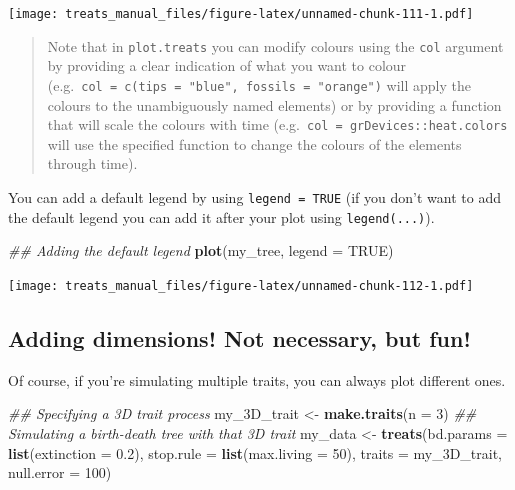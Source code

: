 \documentclass[
]{book}
\newenvironment{Shaded}{\begin{snugshade}}{\end{snugshade}}
\newcommand{\CommentTok}[1]{\textcolor[rgb]{0.56,0.35,0.01}{\textit{#1}}}
\newcommand{\DataTypeTok}[1]{\textcolor[rgb]{0.13,0.29,0.53}{#1}}
\newcommand{\DecValTok}[1]{\textcolor[rgb]{0.00,0.00,0.81}{#1}}
\newcommand{\FloatTok}[1]{\textcolor[rgb]{0.00,0.00,0.81}{#1}}
\newcommand{\KeywordTok}[1]{\textcolor[rgb]{0.13,0.29,0.53}{\textbf{#1}}}
\newcommand{\NormalTok}[1]{#1}
\newcommand{\OtherTok}[1]{\textcolor[rgb]{0.56,0.35,0.01}{#1}}
\newcommand{\StringTok}[1]{\textcolor[rgb]{0.31,0.60,0.02}{#1}}
\begin{document}
\texttt{[image: treats\_manual\_files/figure-latex/unnamed-chunk-111-1.pdf]}

\begin{quote}
Note that in \texttt{plot.treats} you can modify colours using the \texttt{col} argument by providing a clear indication of what you want to colour (e.g.~\texttt{col\ =\ c(tips\ =\ "blue",\ fossils\ =\ "orange")} will apply the colours to the unambiguously named elements) or by providing a function that will scale the colours with time (e.g.~\texttt{col\ =\ grDevices::heat.colors} will use the specified function to change the colours of the elements through time).
\end{quote}

You can add a default legend by using \texttt{legend\ =\ TRUE} (if you don't want to add the default legend you can add it after your plot using \texttt{legend(...)}).

\begin{Shaded}
\begin{Highlighting}[]
\CommentTok{\#\# Adding the default legend}
\KeywordTok{plot}\NormalTok{(my\_tree, }\DataTypeTok{legend =} \OtherTok{TRUE}\NormalTok{)}
\end{Highlighting}
\end{Shaded}

\texttt{[image: treats\_manual\_files/figure-latex/unnamed-chunk-112-1.pdf]}

\hypertarget{adding-dimensions-not-necessary-but-fun}{%
\subsection{Adding dimensions! Not necessary, but fun!}\label{adding-dimensions-not-necessary-but-fun}}

Of course, if you're simulating multiple traits, you can always plot different ones.

\begin{Shaded}
\begin{Highlighting}[]
\CommentTok{\#\# Specifying a 3D trait process}
\NormalTok{my\_3D\_trait \textless{}{-}}\StringTok{ }\KeywordTok{make.traits}\NormalTok{(}\DataTypeTok{n =} \DecValTok{3}\NormalTok{)}
\CommentTok{\#\# Simulating a birth{-}death tree with that 3D trait}
\NormalTok{my\_data \textless{}{-}}\StringTok{ }\KeywordTok{treats}\NormalTok{(}\DataTypeTok{bd.params  =} \KeywordTok{list}\NormalTok{(}\DataTypeTok{extinction =} \FloatTok{0.2}\NormalTok{),}
                  \DataTypeTok{stop.rule  =} \KeywordTok{list}\NormalTok{(}\DataTypeTok{max.living =} \DecValTok{50}\NormalTok{),}
                  \DataTypeTok{traits     =}\NormalTok{ my\_3D\_trait,}
                  \DataTypeTok{null.error =} \DecValTok{100}\NormalTok{)}
\end{Highlighting}
\end{Shaded}
\end{document}
